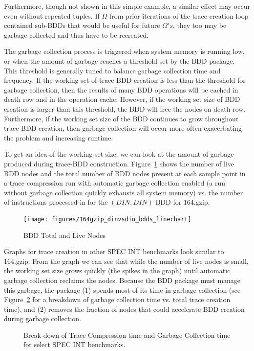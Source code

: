 \documentclass[defaultstyle,11pt]{thesis}
\begin{document}
Furthermore, though not shown in this simple example, a similar effect
may occur even without repeated tuples.  If $\Omega$ from prior
iterations of the trace creation loop contained sub-BDDs that would be
useful for future $\Omega's$, they too may be garbage collected and
thus have to be recreated.

The garbage collection process is triggered when system memory is
running low, or when the amount of garbage reaches a threshold set by
the BDD package.  This threshold is generally tuned to balance garbage
collection time and frequency.  If the working set of trace-BDD
creation is less than the threshold for garbage collection, then the
results of many BDD operations will be cached in death row and in the
operation cache.  However, if the working set size of BDD creation is
larger than this threshold, the BDD will free the nodes on death
row. Furthermore, if the working set size of the BDD continues to grow
throughout trace-BDD creation, then garbage collection will occur more
often exacerbating the problem and increasing runtime.

To get an idea of the working set size, we can look at the amount of
garbage produced during trace-BDD construction.
Figure~\ref{fig:164gzipBDDline} shows the number of live BDD nodes and
the total number of BDD nodes present at each sample point in a trace
compression run with automatic garbage collection enabled (a run
without garbage collection quickly exhausts all system memory) vs. the
number of instructions processed in for the $(DIN,DIN)$ BDD for
164.gzip.

\begin{figure}
  \centering
    \texttt{[image: figures/164gzip\_dinvsdin\_bdds\_linechart]}
\caption{BDD Total and Live Nodes}
\label{fig:164gzipBDDline}
\end{figure}

Graphs for trace creation in other SPEC INT benchmarks look similar to
164.gzip.  From the graph we can see that while the number of live
nodes is small, the working set size grows quickly (the spikes in the
graph) until automatic garbage collection reclaims the nodes.  Because
the BDD package must manage this garbage, the package (1) spends most
of its time in garbage collection (see
Figure~\ref{fig:specintbreakdown} for a breakdown of garbage
collection time vs. total trace creation time), and (2) removes the
fraction of nodes that could accelerate BDD creation during garbage
collection.

\begin{figure}
\caption{Break-down of Trace Compression time and Garbage Collection time for select SPEC INT benchmarks.}
\label{fig:specintbreakdown}
\end{figure}
\end{document}
